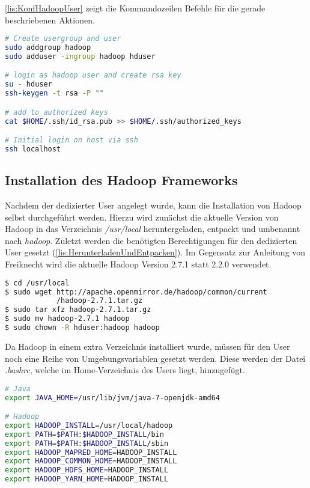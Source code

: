 \autoref{lis:KonfHadoopUser} zeigt die Kommandozeilen Befehle für die gerade beschriebenen Aktionen. \\

\begin{lstlisting}[language=bash, caption={Konfiguration des Hadoop Users}, label=lis:KonfHadoopUser]
# Create usergroup and user
sudo addgroup hadoop
sudo adduser -ingroup hadoop hduser

# login as hadoop user and create rsa key
su - hduser
ssh-keygen -t rsa -P ""

# add to authorized keys
cat $HOME/.ssh/id_rsa.pub >> $HOME/.ssh/authorized_keys

# Initial login on host via ssh
ssh localhost
\end{lstlisting}

\subsection{Installation des Hadoop Frameworks}
Nachdem der dedizierter User angelegt wurde, kann die Installation von Hadoop selbst durchgeführt werden. Hierzu wird zunächst die aktuelle Version von Hadoop in das Verzeichnis \textit{/usr/local} heruntergeladen, entpackt und umbenannt nach \textit{hadoop}. Zuletzt werden die benötigten Berechtigungen für den dedizierten User gesetzt (\autoref{lis:HerunterladenUndEntpacken}). Im Gegensatz zur Anleitung von Freiknecht wird die aktuelle Hadoop Version 2.7.1 statt 2.2.0 verwendet. \\

\begin{lstlisting}[language=bash, caption={Herunterladen und entpacke von Hadoop}, label=lis:HerunterladenUndEntpacken]
$ cd /usr/local
$ sudo wget http://apache.openmirror.de/hadoop/common/current
            /hadoop-2.7.1.tar.gz
$ sudo tar xfz hadoop-2.7.1.tar.gz
$ sudo mv hadoop-2.7.1 hadoop
$ sudo chown -R hduser:hadoop hadoop
\end{lstlisting}

Da Hadoop in einem extra Verzeichnis installiert wurde, müssen für den User noch eine Reihe von Umgebungsvariablen gesetzt werden. Diese werden der Datei \textit{.bashrc}, welche im Home-Verzeichnis des Users liegt, hinzugefügt. \\

\begin{lstlisting}[language=bash, caption={Umgebungsvariablen für Hadoop}, label=lis:Umgebungsvariablen]
# Java
export JAVA_HOME=/usr/lib/jvm/java-7-openjdk-amd64

# Hadoop
export HADOOP_INSTALL=/usr/local/hadoop
export PATH=$PATH:$HADOOP_INSTALL/bin
export PATH=$PATH:$HADOOP_INSTALL/sbin
export HADOOP_MAPRED_HOME=HADOOP_INSTALL
export HADOOP_COMMON_HOME=HADOOP_INSTALL
export HADOOP_HDFS_HOME=HADOOP_INSTALL
export HADOOP_YARN_HOME=HADOOP_INSTALL
\end{lstlisting}


